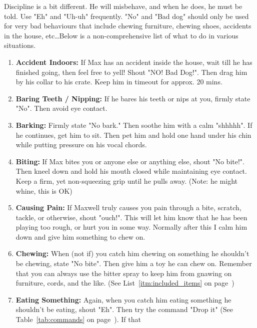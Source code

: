 \documentclass[pdftex,12pt]{article}
\begin{document}
\bigskip

Discipline is a bit different. He will misbehave, and when he does, he must be
told. Use "Eh" and "Uh-uh" frequently. "No" and "Bad dog" should only be used
for very bad behaviours that include chewing furniture, chewing shoes, accidents
in the house, etc\ldots Below is a non-comprehensive list of what to do in
various situations.

\bigskip

\begin{enumerate}\label{itm:discipline}
    \item \textbf{Accident Indoors:} If Max has an accident inside the house,
        wait till he has finished going, then feel free to yell! Shout "NO!
        Bad Dog!". Then drag him by his collar to his crate. Keep him in
        timeout for approx. 20 mins.
    \item \textbf{Baring Teeth / Nipping:} If he bares his teeth or nips at you,
        firmly state "No". Then avoid eye contact.
    \item \textbf{Barking:} Firmly state "No bark." Then soothe him with a calm
        "shhhhh". If he continues, get him to sit. Then pet him and hold one
        hand under his chin while putting pressure on his vocal chords.
    \item \textbf{Biting:} If Max bites you or anyone else or anything else,
        shout "No bite!". Then kneel down and hold his mouth closed while
        maintaining eye contact. Keep a firm, yet non-squeezing grip until he
        pulls away. (Note: he might whine, this is OK)
    \item \textbf{Causing Pain:} If Maxwell truly causes you pain through a
        bite, scratch, tackle, or otherwise, shout "ouch!". This will let
        him know that he has been playing too rough, or hurt you in some way.
        Normally after this I calm him down and give him something to chew on.
    \item \textbf{Chewing:} When (not if) you catch him chewing on something he
        shouldn't be chewing, state "No bite". Then give him a toy he can chew
        on. Remember that you can always use the bitter spray to keep him from
        gnawing on furniture, cords, and the like. (See List~\ref{itm:included_items} on
        page~\pageref{itm:included_items})
    \item \textbf{Eating Something:} Again, when you catch him eating something
        he shouldn't be eating, shout "Eh". Then try the command "Drop it" (See
        Table~\ref{tab:commands} on page~\pageref{tab:commands}). If that

\end{enumerate}
\end{document}
